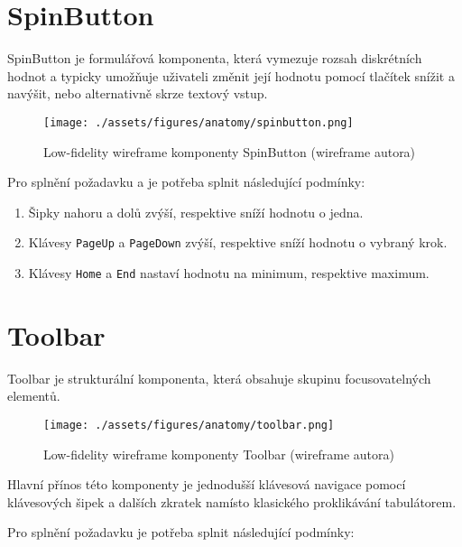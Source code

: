 \section{SpinButton}

SpinButton je formulářová komponenta, která vymezuje rozsah diskrétních hodnot a typicky umožňuje uživateli změnit její hodnotu pomocí tlačítek snížit a navýšit, nebo alternativně skrze textový vstup.

\begin{figure}[htp]
    \centering
    \texttt{[image: ./assets/figures/anatomy/spinbutton.png]}
    \captionsetup{justification=centering}
    \caption[Low-fidelity wireframe komponenty SpinButton]{Low-fidelity wireframe komponenty SpinButton (wireframe autora)}
\end{figure}

Pro splnění požadavku \hyperref[ofr11]{} a \hyperref[sfr12]{} je potřeba splnit následující podmínky:

\begin{enumerate}
    \item Šipky nahoru a dolů zvýší, respektive sníží hodnotu o jedna.
    \item Klávesy \texttt{PageUp} a \texttt{PageDown} zvýší, respektive sníží hodnotu o vybraný krok.
    \item Klávesy \texttt{Home} a \texttt{End} nastaví hodnotu na minimum, respektive maximum.
\end{enumerate}

\section{Toolbar}

Toolbar je strukturální komponenta, která obsahuje skupinu focusovatelných elementů.

\begin{figure}[htp]
    \centering
    \texttt{[image: ./assets/figures/anatomy/toolbar.png]}
    \captionsetup{justification=centering}
    \caption[Low-fidelity wireframe komponenty Toolbar]{Low-fidelity wireframe komponenty Toolbar (wireframe autora)}
\end{figure}

Hlavní přínos této komponenty je jednodušší klávesová navigace pomocí klávesových šipek a dalších zkratek namísto klasického proklikávání tabulátorem.

Pro splnění požadavku \hyperref[ofr11]{} je potřeba splnit následující podmínky:

